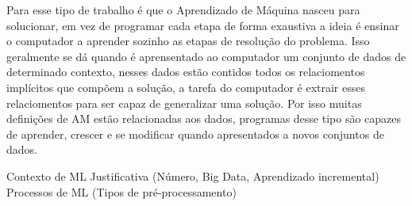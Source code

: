 Para esse tipo de trabalho é que o Aprendizado de Máquina nasceu para solucionar, em vez de programar cada etapa de forma exaustiva a ideia é ensinar o computador a aprender sozinho as etapas de resolução do problema. Isso geralmente se dá quando é aprensentado ao computador um conjunto de dados de determinado contexto, nesses dados estão contidos todos os relaciomentos implícitos que compõem a solução, a tarefa do computador é extrair esses relaciomentos para ser capaz de generalizar uma solução. Por isso muitas definições de AM estão relacionadas aos dados, programas desse tipo são capazes de aprender, crescer e se modificar quando apresentados a novos conjuntos de dados.





Contexto de ML
Justificativa (Número, Big Data, Aprendizado incremental)
Processos de ML (Tipos de pré-processamento)

